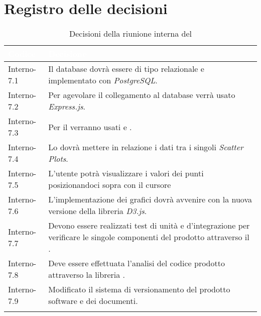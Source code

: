 \section{Registro delle decisioni}
{
\renewcommand{\arraystretch}{1.5}
\centering
\begin{longtable}{C{3cm} C{9cm}}
\textcolor{white}{\textbf{Codice}}&
\textcolor{white}{\textbf{Decisione}}\\	

\endhead
		
Interno-7.1 & Il database dovrà essere di tipo relazionale e implementato con \textit{PostgreSQL}.\\
Interno-7.2 & Per agevolare il collegamento al database verrà usato \textit{Express.js}.\\
Interno-7.3 & Per il  verranno usati \textit{} e \textit{}.\\
Interno-7.4 & Lo \textit{} dovrà mettere in relazione i dati tra i singoli \textit{Scatter Plots}.\\
Interno-7.5 & L'utente potrà visualizzare i valori dei punti posizionandoci sopra con il cursore\\
Interno-7.6 & L'implementazione dei grafici dovrà avvenire con la nuova versione della libreria \textit{D3.js}.\\
Interno-7.7 & Devono essere realizzati test di unità e d'integrazione per
verificare le singole componenti del prodotto attraverso il  \textit{}.\\
Interno-7.8 & Deve essere effettuata l'analisi del codice prodotto attraverso la libreria \textit{}.\\
Interno-7.9 & Modificato il sistema di versionamento del prodotto software e dei documenti.\\
\caption{Decisioni della riunione interna del \Data{}}
\end{longtable}
}
